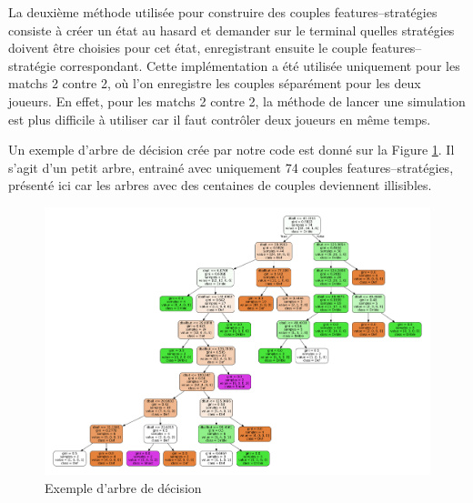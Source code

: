 \documentclass[a4paper,12pt]{article}
\begin{document}
La deuxième méthode utilisée pour construire des couples features--stratégies con\-siste à créer un état au hasard et demander sur le terminal quelles stratégies doivent être choisies pour cet état, enregistrant ensuite le couple features--stratégie correspondant. Cette implémentation a été utilisée uniquement pour les matchs 2 contre 2, où l'on enregistre les couples séparément pour les deux joueurs. En effet, pour les matchs 2 contre 2, la méthode de lancer une simulation est plus difficile à utiliser car il faut contrôler deux joueurs en même temps.

Un exemple d'arbre de décision crée par notre code est donné sur la Figure \ref{Figure10}. Il s'agit d'un petit arbre, entrainé avec uniquement 74 couples features--stratégies, présenté ici car les arbres avec des centaines de couples deviennent illisibles.

\begin{figure}[ht]
\centering
\includegraphics[width=\textwidth]{test_arbre}
\caption{Exemple d'arbre de décision}
\label{Figure10}
\end{figure}
\end{document}
